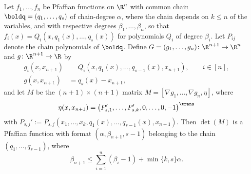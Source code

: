 \begin{lemma}\label{lem:rolle-det-degree}
Let $f_1,\dots,f_n$ be Pfaffian functions on $\R^n$ with common chain $\boldq = (q_1,\dots,q_s)$ of chain-degree $\alpha$, where the chain depends on $k\leq n$ of the variables, and with respective degrees $\beta_1,\dots,\beta_n$, so that $f_i(x) = Q_i(x, q_1(x),\dots,q_s(x))$ for polynomials $Q_i$ of degree $\beta_i$. Let $P_{ij}$ denote the chain polynomials of $\boldq$. Define $G = (g_1,\dots,g_n)\colon \R^{n+1}\to \R^n$ and $g\colon \R^{n+1}\to \R$ by
\begin{align*}
  g_i(x, x_{n+1}) &= Q_i(x, q_1(x),\dots,q_{s-1}(x), x_{n+1}), \qquad i\in [n],\\
  g(x, x_{n+1}) &= q_s(x) - x_{n+1},
\end{align*}
and let $M$ be the $(n+1)\times (n+1)$ matrix $M = [\nabla g_1, \dots, \nabla g_n, \eta]$, where
\begin{equation*}
  \eta(x, x_{n+1}) = \bigl(P_{s,1}',\dots,P_{s,k}', 0,\dots,0, -1\bigr)^{\trans}
\end{equation*}
with $P_{s,j}' := P_{s,j}(x_1,\dots,x_k, q_1(x),\dots,q_{s-1}(x), x_{n+1})$. 
Then $\det(M)$ is a Pfaffian function with format $(\alpha, \beta_{n+1}, s-1)$ belonging to the chain $(q_1,\dots,q_{s-1})$, where
\begin{equation}\label{eqn:rolle-det-degree}
  \beta_{n+1} \leq \sum_{i=1}^n (\beta_i - 1) + \min\{k, s\}\alpha.
\end{equation}
\end{lemma}


